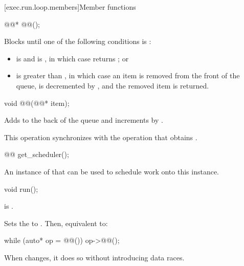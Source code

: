 [exec.run.loop.members]{Member functions}

\begin{itemdecl}
@@* @@();
\end{itemdecl}

\begin{itemdescr}
\pnum
\effects
Blocks until one of the following conditions is :
\begin{itemize}
\item
{} is  and  is ,
in which case  returns ; or
\item
{} is greater than ,
in which case an item is removed from the front of the queue,
 is decremented by , and
the removed item is returned.
\end{itemize}
\end{itemdescr}

\begin{itemdecl}
void @@(@@* item);
\end{itemdecl}

\begin{itemdescr}
\pnum
\effects
Adds  to the back of the queue and
increments  by .

\pnum
\sync
This operation synchronizes with
the  operation that obtains .
\end{itemdescr}

%
\begin{itemdecl}
@@ get_scheduler();
\end{itemdecl}

\begin{itemdescr}
\pnum
\returns
An instance of 
that can be used to schedule work onto this  instance.
\end{itemdescr}

%
\begin{itemdecl}
void run();
\end{itemdecl}

\begin{itemdescr}
\pnum
\expects
{} is .

\pnum
\effects
Sets the  to . Then, equivalent to:
\begin{codeblock}
while (auto* op = @@()) {
  op->@@();
}
\end{codeblock}

\pnum
\remarks
When  changes, it does so without introducing data races.
\end{itemdescr}

